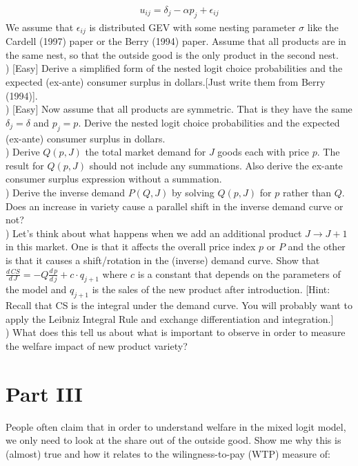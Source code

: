 \documentclass[12pt]{article}
\begin{document}
\begin{eqnarray*}
u_{ij} = \delta_j - \alpha p_j + \epsilon_{ij}
\end{eqnarray*}
We assume that $\epsilon_{ij}$ is distributed GEV with some nesting parameter $\sigma$ like the Cardell (1997) paper or the Berry (1994) paper. Assume that all products are in the same nest, so that the outside good is the only product in the second nest.\\

) [Easy] Derive a simplified form of the nested logit choice probabilities and the expected (ex-ante) consumer surplus in dollars.[Just write them from Berry (1994)].\\

) [Easy] Now assume that all products are symmetric. That is they have the same $\delta_j = \delta$ and $p_j = p$. Derive the nested logit choice probabilities and the expected (ex-ante) consumer surplus in dollars. \\

) Derive $Q(p,J)$ the total market demand for $J$ goods each with price $p$. The result for $Q(p,J)$ should not include any summations. Also derive the ex-ante consumer surplus expression without a summation.\\

) Derive the inverse demand $P(Q,J)$ by solving $Q(p,J)$ for $p$ rather than $Q$. Does an increase in variety cause a parallel shift in the inverse demand curve or not?\\

) Let's think about what happens when we add an additional product $J \rightarrow J+1$ in this market. One is that it affects the overall price index $p$ or $P$ and the other is that it causes a shift/rotation in the (inverse) demand curve. Show that $\frac{d\, CS}{d\, J} = -Q \frac{d\, p}{d\, j} +  c \cdot q_{j+1}$ where $c$ is a constant that depends on the parameters of the model and $q_{j+1}$ is the sales of the new product after introduction. [Hint: Recall that CS is the integral under the demand curve. You will probably want to apply the Leibniz Integral Rule and exchange differentiation and integration.]\\


) What does this tell us about what is important to observe in order to measure the welfare impact of new product variety?


\section*{\normalsize Part III}
People often claim that in order to understand welfare in the mixed logit model, we only need to look at the share out of the outside good. Show me why this is (almost) true and how it relates to the wilingness-to-pay (WTP) measure of:
\end{document}
